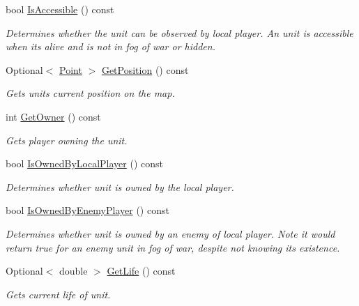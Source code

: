 \begin{DoxyCompactItemize}
\item 
bool \hyperlink{class_s_c2_a_p_i_1_1_unit_ab1bca6383cac10ca0502097828ba3004}{Is\+Accessible} () const 
\begin{DoxyCompactList}\small\item\em Determines whether the unit can be observed by local player. An unit is accessible when it\textquotesingle{}s alive and is not in fog of war or hidden. \end{DoxyCompactList}\item 
Optional$<$ \hyperlink{struct_s_c2_a_p_i_1_1_point}{Point} $>$ \hyperlink{class_s_c2_a_p_i_1_1_unit_a524651fdec4942656f25e2ece4ea70f1}{Get\+Position} () const 
\begin{DoxyCompactList}\small\item\em Gets unit\textquotesingle{}s current position on the map. \end{DoxyCompactList}\item 
int \hyperlink{class_s_c2_a_p_i_1_1_unit_ac99df1c5d2b459590453bae3831824af}{Get\+Owner} () const 
\begin{DoxyCompactList}\small\item\em Gets player owning the unit. \end{DoxyCompactList}\item 
bool \hyperlink{class_s_c2_a_p_i_1_1_unit_a1386e50bfc8169799b4c0a5218921f3c}{Is\+Owned\+By\+Local\+Player} () const 
\begin{DoxyCompactList}\small\item\em Determines whether unit is owned by the local player. \end{DoxyCompactList}\item 
bool \hyperlink{class_s_c2_a_p_i_1_1_unit_a961023ad26d43f55beb70bada87e3c5e}{Is\+Owned\+By\+Enemy\+Player} () const 
\begin{DoxyCompactList}\small\item\em Determines whether unit is owned by an enemy of local player. Note it would return true for an enemy unit in fog of war, despite not knowing its existence. \end{DoxyCompactList}\item 
Optional$<$ double $>$ \hyperlink{class_s_c2_a_p_i_1_1_unit_a10e23bed2cb5ce11257d21fbb3f31a9d}{Get\+Life} () const 
\begin{DoxyCompactList}\small\item\em Gets current life of unit. \end{DoxyCompactList}\item 

\end{DoxyCompactItemize}
